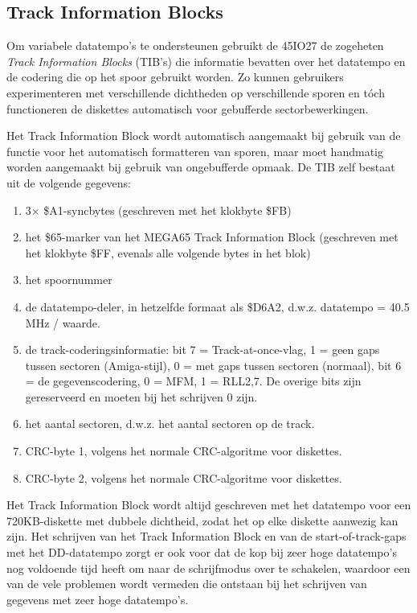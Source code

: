 \subsection{Track Information Blocks}

Om variabele datatempo's te ondersteunen gebruikt de 45IO27 de zogeheten {\em Track Information Blocks} (TIB's) die informatie bevatten over het datatempo en de codering die op het spoor gebruikt worden. Zo kunnen gebruikers experimenteren met verschillende dichtheden op verschillende sporen en tóch functioneren de diskettes automatisch voor gebufferde sectorbewerkingen.

Het Track Information Block wordt automatisch aangemaakt bij gebruik van de functie voor het automatisch formatteren van sporen, maar moet handmatig worden aangemaakt bij gebruik van ongebufferde opmaak. De TIB zelf bestaat uit de volgende gegevens:

\begin{enumerate}
\item 3$\times$ \$A1-syncbytes (geschreven met het klokbyte \$FB)\item het \$65-marker van het MEGA65 Track Information Block (geschreven met het klokbyte \$FF, evenals alle volgende bytes in het blok)\item het spoornummer\item de datatempo-deler, in hetzelfde formaat als \$D6A2, d.w.z. datatempo = 40.5 MHz / waarde.\item de track-coderingsinformatie: bit 7 = Track-at-once-vlag, 1 = geen gaps tussen sectoren (Amiga-stijl), 0 = met gaps tussen sectoren (normaal), bit 6 = de gegevenscodering, 0 = MFM, 1 = RLL2,7. De overige bits zijn gereserveerd en moeten bij het schrijven 0 zijn.\item het aantal sectoren, d.w.z. het aantal sectoren op de track.\item CRC-byte 1, volgens het normale CRC-algoritme voor diskettes.\item CRC-byte 2, volgens het normale CRC-algoritme voor diskettes.
\end{enumerate}

Het Track Information Block wordt altijd geschreven met het datatempo voor een 720KB-diskette met dubbele dichtheid, zodat het op elke diskette aanwezig kan zijn. Het schrijven van het Track Information Block en van de start-of-track-gaps met het DD-datatempo zorgt er ook voor dat de kop bij zeer hoge datatempo's nog voldoende tijd heeft om naar de schrijfmodus over te schakelen, waardoor een van de vele problemen wordt vermeden die ontstaan bij het schrijven van gegevens met zeer hoge datatempo's.

